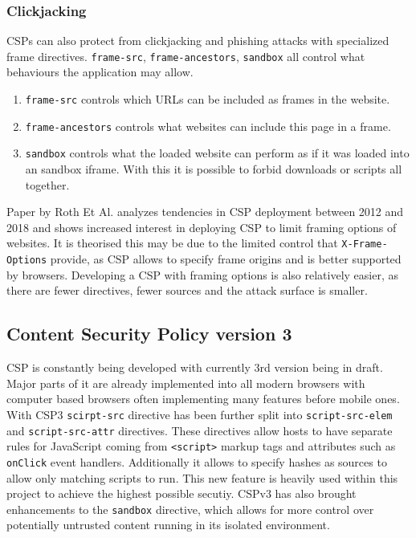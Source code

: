 \subsubsection{Clickjacking}
CSPs can also protect from clickjacking and phishing attacks with specialized frame directives. 
\texttt{frame-src}, \texttt{frame-ancestors}, \texttt{sandbox} all control what behaviours the application may allow.
\begin{enumerate}
	\item \texttt{frame-src} controls which URLs can be included as frames in the website.
	\item \texttt{frame-ancestors} controls what websites can include this page in a frame.
	\item \texttt{sandbox} controls what the loaded website can perform as if it was loaded into an sandbox iframe. With this it is possible to forbid downloads or scripts all together.
\end{enumerate}
Paper by Roth Et Al. analyzes tendencies in CSP deployment between 2012 and 2018 and shows increased interest in deploying CSP to limit framing options of websites. \cite{osti_10173479}
It is theorised this may be due to the limited control that \texttt{X-Frame-Options} provide, as CSP allows to specify frame origins and is better supported by browsers.
Developing a CSP with framing options is also relatively easier, as there are fewer directives, fewer sources and the attack surface is smaller.

\subsection{Content Security Policy version 3}
CSP is constantly being developed with currently 3rd version being in draft.
Major parts of it are already implemented into all modern browsers with computer based browsers often implementing many features before mobile ones.
With CSP3 \texttt{scirpt-src} directive has been further split into \texttt{script-src-elem} and \texttt{script-src-attr} directives.
These directives allow hosts to have separate rules for JavaScript coming from \texttt{<script>} markup tags and attributes such as \texttt{onClick} event handlers.
Additionally it allows to specify hashes as sources to allow only matching scripts to run.
This new feature is heavily used within this project to achieve the highest possible secutiy.
CSPv3 has also brought enhancements to the \texttt{sandbox} directive, which allows for more control over potentially untrusted content running in its isolated environment.

